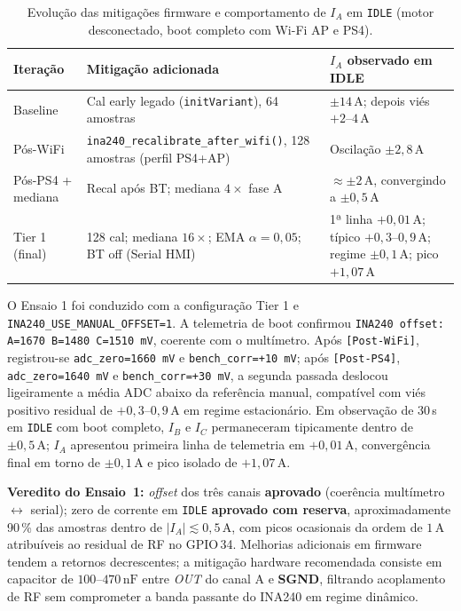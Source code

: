\begin{table}[H]
    \centering
    \caption{Evolução das mitigações firmware e comportamento de $I_A$ em \texttt{IDLE} (motor desconectado, boot completo com Wi-Fi AP e PS4).}
    \label{tab:evolucao_mitigacao_ina240_a}
    \begin{tabular}{p{3.8cm}p{5.2cm}p{5.5cm}}
        \toprule
        \textbf{Iteração} & \textbf{Mitigação adicionada} & \textbf{$I_A$ observado em IDLE} \\
        \midrule
        Baseline &
        Cal early legado (\texttt{initVariant}), 64 amostras &
        $\pm 14\,\text{A}$; depois viés $+2$--$4\,\text{A}$ \\
        Pós-WiFi &
        \texttt{ina240\_recalibrate\_after\_wifi()}, 128 amostras (perfil PS4+AP) &
        Oscilação $\pm 2{,}8\,\text{A}$ \\
        Pós-PS4 + mediana &
        Recal após BT; mediana $4\times$ fase A &
        $\approx \pm 2\,\text{A}$, convergindo a $\pm 0{,}5\,\text{A}$ \\
        Tier 1 (final) &
        128 cal; mediana $16\times$; EMA $\alpha=0{,}05$; BT off (Serial HMI) &
        1ª linha $+0{,}01\,\text{A}$; típico $+0{,}3$--$0{,}9\,\text{A}$; regime $\pm 0{,}1\,\text{A}$; pico $+1{,}07\,\text{A}$ \\
        \bottomrule
    \end{tabular}
\end{table}


O Ensaio 1 foi conduzido com a configuração Tier 1 e \texttt{INA240\_USE\_MANUAL\_OFFSET=1}. A telemetria de boot confirmou \texttt{INA240 offset: A=1670 B=1480 C=1510 mV}, coerente com o multímetro. Após \texttt{[Post-WiFi]}, registrou-se \texttt{adc\_zero=1660 mV} e \texttt{bench\_corr=+10 mV}; após \texttt{[Post-PS4]}, \texttt{adc\_zero=1640 mV} e \texttt{bench\_corr=+30 mV}, a segunda passada deslocou ligeiramente a média ADC abaixo da referência manual, compatível com viés positivo residual de $+0{,}3$--$0{,}9\,\text{A}$ em regime estacionário. Em observação de 30\,s em \texttt{IDLE} com boot completo, $I_B$ e $I_C$ permaneceram tipicamente dentro de $\pm 0{,}5\,\text{A}$; $I_A$ apresentou primeira linha de telemetria em $+0{,}01\,\text{A}$, convergência final em torno de $\pm 0{,}1\,\text{A}$ e pico isolado de $+1{,}07\,\text{A}$.

\textbf{Veredito do Ensaio~1:} \textit{offset} dos três canais \textbf{aprovado} (coerência multímetro $\leftrightarrow$ serial); zero de corrente em \texttt{IDLE} \textbf{aprovado com reserva}, aproximadamente 90\,\% das amostras dentro de $|I_A| \lesssim 0{,}5\,\text{A}$, com picos ocasionais da ordem de $1\,\text{A}$ atribuíveis ao residual de RF no GPIO\,34. Melhorias adicionais em firmware tendem a retornos decrescentes; a mitigação hardware recomendada consiste em capacitor de $100$--$470\,\text{nF}$ entre \textit{OUT} do canal A e \textbf{SGND}, filtrando acoplamento de RF sem comprometer a banda passante do INA240 em regime dinâmico.


